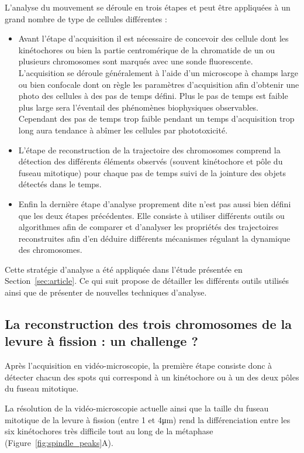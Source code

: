 \documentclass[12pt,a4paper,twoside,openright]{book}
\begin{document}
L'analyse du mouvement se déroule en trois étapes et peut être
appliquées à un grand nombre de type de cellules différentes :

\begin{itemize}
\item
  Avant l'étape d'acquisition il est nécessaire de concevoir des cellule
  dont les kinétochores ou bien la partie centromérique de la chromatide
  de un ou plusieurs chromosomes sont marqués avec une sonde
  fluorescente. L'acquisition se déroule généralement à l'aide d'un
  microscope à champs large ou bien confocale dont on règle les
  paramètres d'acquisition afin d'obtenir une photo des cellules à des
  pas de temps défini. Plus le pas de temps est faible plus large sera
  l'éventail des phénomènes biophysiques observables. Cependant des pas
  de temps trop faible pendant un temps d'acquisition trop long aura
  tendance à abîmer les cellules par phototoxicité.
\item
  L'étape de reconstruction de la trajectoire des chromosomes comprend
  la détection des différents éléments observés (souvent kinétochore et
  pôle du fuseau mitotique) pour chaque pas de temps suivi de la
  jointure des objets détectés dans le temps.
\item
  Enfin la dernière étape d'analyse proprement dite n'est pas aussi bien
  défini que les deux étapes précédentes. Elle consiste à utiliser
  différents outils ou algorithmes afin de comparer et d'analyser les
  propriétés des trajectoires reconstruites afin d'en déduire différents
  mécanismes régulant la dynamique des chromosomes.
\end{itemize}

Cette stratégie d'analyse a été appliquée dans l'étude présentée en
Section~\ref{sec:article}. Ce qui suit propose de détailler les
différents outils utilisés ainsi que de présenter de nouvelles
techniques d'analyse.

\subsection{La reconstruction des trois chromosomes de la levure à
fission : un challenge
?}\label{la-reconstruction-des-trois-chromosomes-de-la-levure-uxe0-fission-un-challenge}

Après l'acquisition en vidéo-microscopie, la première étape consiste
donc à détecter chacun des spots qui correspond à un kinétochore ou à un
des deux pôles du fuseau mitotique.

La résolution de la vidéo-microscopie actuelle ainsi que la taille du
fuseau mitotique de la levure à fission (entre 1 et 4μm) rend la
différenciation entre les six kinétochores très difficile tout au long
de la métaphase (Figure~\ref{fig:spindle_peaks}A).
\end{document}
